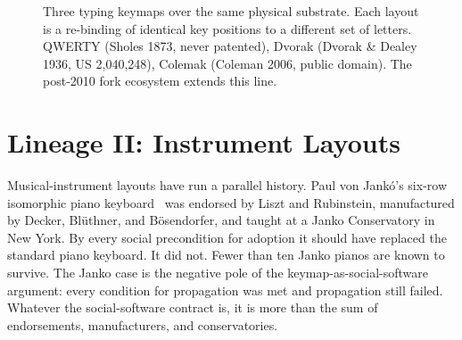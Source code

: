 \documentclass[10pt,letterpaper,twocolumn]{article}
\begin{document}
\begin{figure}[t]
\centering
{}
\caption{Three typing keymaps over the same physical substrate. Each layout is a re-binding of identical key positions to a different set of letters. QWERTY (Sholes 1873, never patented), Dvorak (Dvorak \& Dealey 1936, US 2{,}040{,}248), Colemak (Coleman 2006, public domain). The post-2010 fork ecosystem extends this line.}
\label{fig:typing-layouts}
\end{figure}

\section{Lineage II: Instrument Layouts}
\label{sec:lineage2}

Musical-instrument layouts have run a parallel history. Paul von Jankó's six-row isomorphic piano keyboard~\citep{janko1882} was endorsed by Liszt and Rubinstein, manufactured by Decker, Blüthner, and Bösendorfer, and taught at a Janko Conservatory in New York. By every social precondition for adoption it should have replaced the standard piano keyboard. It did not. Fewer than ten Janko pianos are known to survive. The Janko case is the negative pole of the keymap-as-social-software argument: every condition for propagation was met and propagation still failed. Whatever the social-software contract is, it is more than the sum of endorsements, manufacturers, and conservatories.
\end{document}
